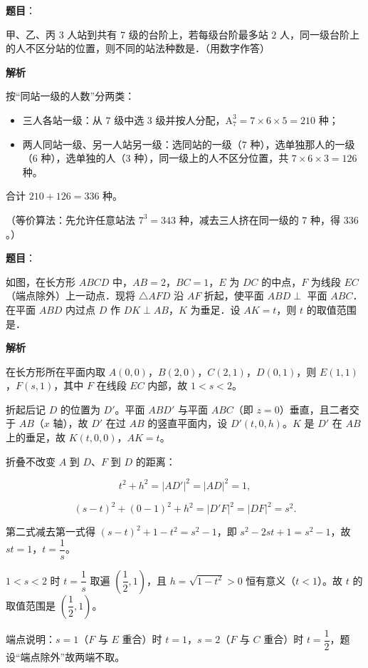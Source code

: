 \begin{answer}

\textbf{题目}：

甲、乙、丙 $3$ 人站到共有 $7$ 级的台阶上，若每级台阶最多站 $2$ 人，同一级台阶上的人不区分站的位置，则不同的站法种数是\gkblank{}．（用数字作答）

\textbf{解析}

按“同站一级的人数”分两类：

\begin{itemize}
\item 三人各站一级：从 $7$ 级中选 $3$ 级并按人分配，$\mathrm A_7^3=7\times6\times5=210$ 种；
\item 两人同站一级、另一人站另一级：选同站的一级（$7$ 种），选单独那人的一级（$6$ 种），选单独的人（$3$ 种），同一级上的人不区分位置，共 $7\times6\times3=126$ 种。
\end{itemize}

合计 $210+126=336$ 种。

（等价算法：先允许任意站法 $7^3=343$ 种，减去三人挤在同一级的 $7$ 种，得 $336$。）


\end{answer}
\begin{answer}

\textbf{题目}：

如图，在长方形 $ABCD$ 中，$AB=2$，$BC=1$，$E$ 为 $DC$ 的中点，$F$ 为线段 $EC$（端点除外）上一动点．现将 $\triangle AFD$ 沿 $AF$ 折起，使平面 $ABD\perp$ 平面 $ABC$．在平面 $ABD$ 内过点 $D$ 作 $DK\perp AB$，$K$ 为垂足．设 $AK=t$，则 $t$ 的取值范围是\gkblank{}．
\nopagebreak[4]
\begin{center}\end{center}
\nopagebreak[4]
\textbf{解析}

在长方形所在平面内取 $A(0,0)$，$B(2,0)$，$C(2,1)$，$D(0,1)$，则 $E(1,1)$，$F(s,1)$，其中 $F$ 在线段 $EC$ 内部，故 $1<s<2$。

折起后记 $D$ 的位置为 $D'$。平面 $ABD'$ 与平面 $ABC$（即 $z=0$）垂直，且二者交于 $AB$（$x$ 轴），故 $D'$ 在过 $AB$ 的竖直平面内，设 $D'(t,0,h)$。$K$ 是 $D'$ 在 $AB$ 上的垂足，故 $K(t,0,0)$，$AK=t$。

折叠不改变 $A$ 到 $D$、$F$ 到 $D$ 的距离：

\nopagebreak[4]
\[t^2+h^2=|AD'|^2=|AD|^2=1,\]

\nopagebreak[4]
\[(s-t)^2+(0-1)^2+h^2=|D'F|^2=|DF|^2=s^2.\]

第二式减去第一式得 $(s-t)^2+1-t^2=s^2-1$，即 $s^2-2st+1=s^2-1$，故 $st=1$，$t=\dfrac1s$。

$1<s<2$ 时 $t=\dfrac1s$ 取遍 $\left(\dfrac12,1\right)$，且 $h=\sqrt{1-t^2}>0$ 恒有意义（$t<1$）。故 $t$ 的取值范围是 $\left(\dfrac12,1\right)$。

端点说明：$s=1$（$F$ 与 $E$ 重合）时 $t=1$，$s=2$（$F$ 与 $C$ 重合）时 $t=\dfrac12$，题设“端点除外”故两端不取。


\end{answer}
